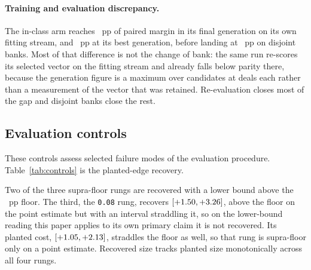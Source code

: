 \paragraph{Training and evaluation discrepancy.} The in-class arm reaches
\vsevenZoneFitMargin{}~pp of paired margin in its final generation on its own fitting stream, and
\vsevenZoneFitPeak{}~pp at its best generation, before landing at \vsevenZoneEdge{}~pp on disjoint
banks. Most of that difference is not the change of bank: the same run re-scores its selected vector
on the fitting stream and already falls below parity there, because the generation figure is a
maximum over candidates at \vsevenBfourDeals{} deals each rather than a measurement of the vector
that was retained. Re-evaluation closes most of the gap and disjoint banks close the rest.

\subsection{Evaluation controls}
\label{sec:results-controls}

These controls assess selected failure modes of the evaluation procedure. Table~\ref{tab:controls}
is the planted-edge recovery.

\begin{table}[!ht]\centering
\caption{Planted-edge recovery, in percentage points of win-rate edge, pooled over both banks with
nominal 95\% intervals. \emph{Planted cost} is the handicap's cost to the target against \sestina{};
\emph{recovered excess} is the responder's edge against the handicapped target minus its edge
against the unhandicapped one, a between-cell contrast. The sub-floor rung must \emph{not} be
recovered.}
\label{tab:controls}
{\tabfont}
\end{table}

Two of the three supra-floor rungs are recovered with a lower bound above the
\vsevenPrimaryFloor{}~pp floor. The third, the \texttt{0.08} rung, recovers
\vsevenBnineHeightExcess{} $[+1.50, +3.26]$, above the floor
on the point estimate but with an interval straddling it, so on the lower-bound reading this paper
applies to its own primary claim it is not recovered. Its planted cost,
\vsevenBnineHeightCost{} $[+1.05, +2.13]$, straddles the floor
as well, so that rung is supra-floor only on a point estimate. Recovered size tracks planted size
monotonically across all four rungs.

